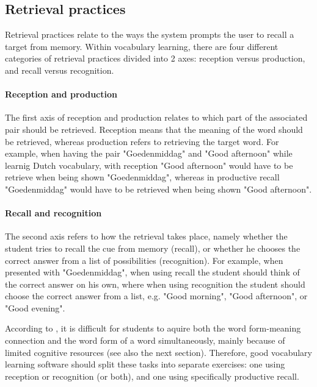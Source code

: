         \subsection{Retrieval practices}

Retrieval practices relate to the ways the system prompts the user to recall a target from memory. Within vocabulary learning, there are four different categories of retrieval practices divided into 2 axes: reception versus production, and recall versus recognition. 

\paragraph{Reception and production} The first axis of reception and production relates to which part of the associated pair should be retrieved. Reception means that the meaning of the word should be retrieved, whereas production refers to retrieving the target word. For example, when having the pair "Goedenmiddag" and "Good afternoon" while learnig Dutch vocabulary, with reception "Good afternoon" would have to be retrieve when being shown "Goedenmiddag", whereas in productive recall "Goedenmiddag" would have to be retrieved when being shown "Good afternoon".

\paragraph{Recall and recognition} The second axis refers to how the retrieval takes place, namely whether the student tries to recall the cue from memory (recall), or whether he chooses the correct answer from a list of possibilities (recognition). For example, when presented with "Goedenmiddag", when using recall the student should think of the correct answer on his own, where when using recognition the student should choose the correct answer from a list, e.g. "Good morning", "Good afternoon", or "Good evening".

According to , it is difficult for students to aquire both the word form-meaning connection and the word form of a word simultaneously, mainly because of limited cognitive resources (see also the next section). Therefore, good vocabulary learning software should split these tasks into separate exercises: one using reception or recognition (or both), and one using specifically productive recall.

